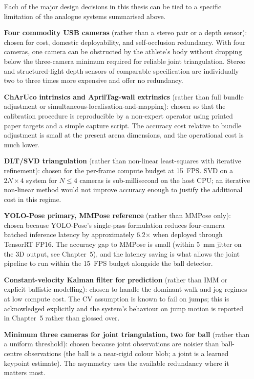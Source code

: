 Each of the major design decisions in this thesis can be tied to a specific limitation of the analogue systems summarised above.

\textbf{Four commodity USB cameras} (rather than a stereo pair or a depth sensor): chosen for cost, domestic deployability, and self-occlusion redundancy. With four cameras, one camera can be obstructed by the athlete's body without dropping below the three-camera minimum required for reliable joint triangulation. Stereo and structured-light depth sensors of comparable specification are individually two to three times more expensive and offer no redundancy.

\textbf{ChArUco intrinsics and AprilTag-wall extrinsics} (rather than full bundle adjustment or simultaneous-localisation-and-mapping): chosen so that the calibration procedure is reproducible by a non-expert operator using printed paper targets and a simple capture script. The accuracy cost relative to bundle adjustment is small at the present arena dimensions, and the operational cost is much lower.

\textbf{DLT/SVD triangulation} (rather than non-linear least-squares with iterative refinement): chosen for the per-frame compute budget at 15~FPS. SVD on a $2N \times 4$ system for $N \le 4$ cameras is sub-millisecond on the host CPU; an iterative non-linear method would not improve accuracy enough to justify the additional cost in this regime.

\textbf{YOLO-Pose primary, MMPose reference} (rather than MMPose only): chosen because YOLO-Pose's single-pass formulation reduces four-camera batched inference latency by approximately 6.2$\times$ when deployed through TensorRT FP16. The accuracy gap to MMPose is small (within 5~mm jitter on the 3D output, see Chapter~5), and the latency saving is what allows the joint pipeline to run within the 15~FPS budget alongside the ball detector.

\textbf{Constant-velocity Kalman filter for prediction} (rather than IMM or explicit ballistic modelling): chosen to handle the dominant walk and jog regimes at low compute cost. The CV assumption is known to fail on jumps; this is acknowledged explicitly and the system's behaviour on jump motion is reported in Chapter~5 rather than glossed over.

\textbf{Minimum three cameras for joint triangulation, two for ball} (rather than a uniform threshold): chosen because joint observations are noisier than ball-centre observations (the ball is a near-rigid colour blob; a joint is a learned keypoint estimate). The asymmetry uses the available redundancy where it matters most.

